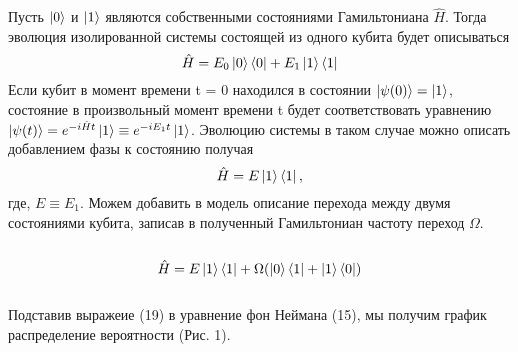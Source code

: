 \documentclass[a4paper, 10pt]{article}
\begin{document}
    Пусть $\ket{0}$ и $\ket{1}$ являются собственными состояниями Гамильтониана  $\hat{H}$. Тогда эволюция изолированной системы состоящей из одного кубита будет описываться 
    \\
    \begin{equation}
        \hat{H} = E_0 \ket{0}\bra{0} + E_1 \ket{1}\bra{1}
    \end{equation}
   Если кубит в момент времени t = 0 находился в состоянии $\ket{\psi(0)} = \ket{1}$, состояние в произвольный момент времени t будет соответствовать уравнению $\ket{\psi(t)}=e^{-i\hat{H}t}\ket{1} \equiv e^{-iE_1t}\ket{1}$. 
   Эволюцию системы в таком случае можно описать добавлением фазы к состоянию получая
    \begin{equation}
        \hat{H} = E \ket{1}\bra{1}, 
    \end{equation}
    где, $E \equiv E_1$. Можем добавить в модель описание перехода между двумя состояниями кубита, записав в полученный Гамильтониан частоту переход $\Omega$.
   \\\\
    \begin{equation}
        \hat{H} = E \ket{1}\bra{1} + \Omega(\ket{0}\bra{1} + \ket{1} \bra{0})
    \end{equation}
    \\
    Подставив выражеие (19) в уравнение фон Неймана (15), мы получим график распределение вероятности (Рис. 1).

    
\end{document}
